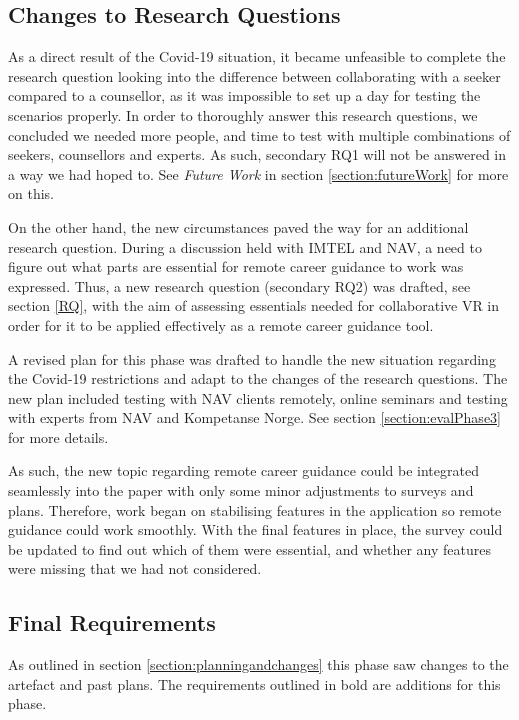 \subsection{Changes to Research Questions}
As a direct result of the Covid-19 situation, it became unfeasible to complete the research question looking into the difference between collaborating with a seeker compared to a counsellor, as it was impossible to set up a day for testing the scenarios properly. In order to thoroughly answer this research questions, we concluded we needed more people, and time to test with multiple combinations of seekers, counsellors and experts. As such, secondary RQ1 will not be answered in a way we had hoped to. See \textit{Future Work} in section \ref{section:futureWork} for more on this.

On the other hand, the new circumstances paved the way for an additional research question. During a discussion held with IMTEL and NAV, a need to figure out what parts are essential for remote career guidance to work was expressed. Thus, a new research question (secondary RQ2) was drafted, see section \ref{RQ}, with the aim of assessing essentials needed for collaborative VR in order for it to be applied effectively as a remote career guidance tool. 

A revised plan for this phase was drafted to handle the new situation regarding the Covid-19 restrictions and adapt to the changes of the research questions. The new plan included testing with NAV clients remotely, online seminars and testing with experts from NAV and Kompetanse Norge. See section \ref{section:evalPhase3} for more details.    

As such, the new topic regarding remote career guidance could be integrated seamlessly into the paper with only some minor adjustments to surveys and plans. Therefore, work began on stabilising features in the application so remote guidance could work smoothly. With the final features in place, the survey could be updated to find out which of them were essential, and whether any features were missing that we had not considered.


\subsection{Final Requirements}
As outlined in section \ref{section:planningandchanges} this phase saw changes to the artefact and past plans. The requirements outlined in bold are additions for this phase.

